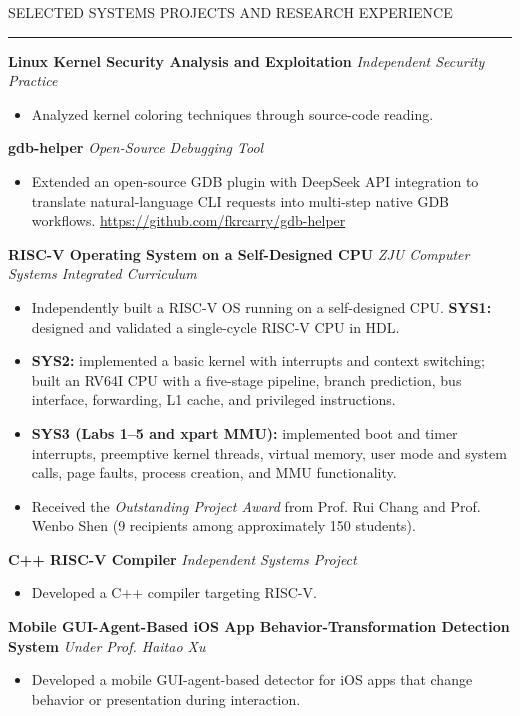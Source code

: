 \documentclass{resume} %
\renewenvironment{rSection}[1]{
\sectionskip
\textcolor{CarnegieMellonRed}{\MakeUppercase{#1}}
\sectionlineskip
\hrule
\begin{list}{}{\setlength{\leftmargin}{1.5em}}
\item[]
}{\end{list}}
\begin{document}
\begin{rSection}{Selected Systems Projects and Research Experience}
\textbf{Linux Kernel Security Analysis and Exploitation} \hfill \textit{Independent Security Practice}\\
\begin{itemize}
    \item Analyzed kernel coloring techniques through source-code reading.
\end{itemize}

\textbf{gdb-helper} \hfill \textit{Open-Source Debugging Tool}\\
\begin{itemize}
    \item Extended an open-source GDB plugin with DeepSeek API integration to translate natural-language CLI requests into multi-step native GDB workflows. \url{https://github.com/fkrcarry/gdb-helper}
\end{itemize}

\textbf{RISC-V Operating System on a Self-Designed CPU} \hfill \textit{ZJU Computer Systems Integrated Curriculum}\\
\begin{itemize}
    \item Independently built a RISC-V OS running on a self-designed CPU. \textbf{SYS1:} designed and validated a single-cycle RISC-V CPU in HDL.
    \item \textbf{SYS2:} implemented a basic kernel with interrupts and context switching; built an RV64I CPU with a five-stage pipeline, branch prediction, bus interface, forwarding, L1 cache, and privileged instructions.
    \item \textbf{SYS3 (Labs 1--5 and xpart MMU):} implemented boot and timer interrupts, preemptive kernel threads, virtual memory, user mode and system calls, page faults, process creation, and MMU functionality.
    \item Received the \textit{Outstanding Project Award} from Prof. Rui Chang and Prof. Wenbo Shen (9 recipients among approximately 150 students).
\end{itemize}

\textbf{C++ RISC-V Compiler} \hfill \textit{Independent Systems Project}\\
\begin{itemize}
    \item Developed a C++ compiler targeting RISC-V.
\end{itemize}

\textbf{Mobile GUI-Agent-Based iOS App Behavior-Transformation Detection System} \hfill \textit{Under Prof. Haitao Xu}\\
\begin{itemize}
    \item Developed a mobile GUI-agent-based detector for iOS apps that change behavior or presentation during interaction.
\end{itemize}


\end{rSection}
\end{document}
